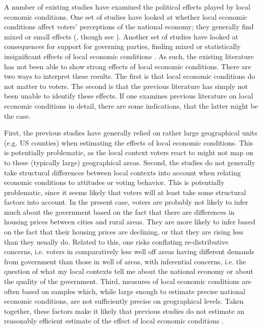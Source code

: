 \documentclass[12pt,a4paper]{article}
\begin{document}
A number of existing studies have examined the political effects played by local economic conditions. One set of studies have looked at whether local economic conditions affect voters' perceptions of the national economy; they generally find mixed or small effects (\citealt{books1999contextual,reeves2012ecologies,anderson2011local,ansolabehere2014mecro}, though see \citealt{dinesen2015reconsidering}). Another set of studies have looked at consequences for support for governing parties, finding mixed or statistically insignificant effects of local economic conditions \citep{hansford2015reevaluating,eisenberg2004economic,kim2003spatial}. As such, the existing literature has not been able to show strong effects of local economic conditions. There are two ways to interpret these results. The first is that local economic conditions do not matter to voters. The second is that the  previous literature has simply not been unable to identify these effects. If one examines previous literature on local economic conditions in detail, there are some indications, that the latter might be the case.

First, the previous studies have generally relied on rather large geographical units (e.g. US counties) when estimating the effects of local economic conditions. This is potentially problematic, as the local context voters react to might not map on to these (typically large) geographical areas. Second, the studies do not generally take structural differences between local contexts into account when relating economic conditions to  attitudes or voting behavior. This is potentially problematic, since it seems likely that voters will at least take some structural factors into account. In the present case, voters are probably not likely to infer much about the government based on the fact that there are differences in housing prices between cities and rural areas. They are more likely to infer based on the fact that their housing prices are declining, or that they are rising less than they usually do. Related to this, one risks conflating re-distributive concerns, i.e. voters in comparatively less well off areas having different demands from government than those in well of areas, with inferential concerns, i.e. the question of what my local contexts tell me about the national economy or about the quality of the government. Third,  measures of local economic conditions are often based on samples which, while large enough to estimate precise national economic conditions, are not sufficiently precise on geographical levels. Taken together, these factors make it likely that previous studies do not estimate an reasonably efficient estimate of the effect of local economic conditions \citep{healy2014presidential}. 
\end{document}
